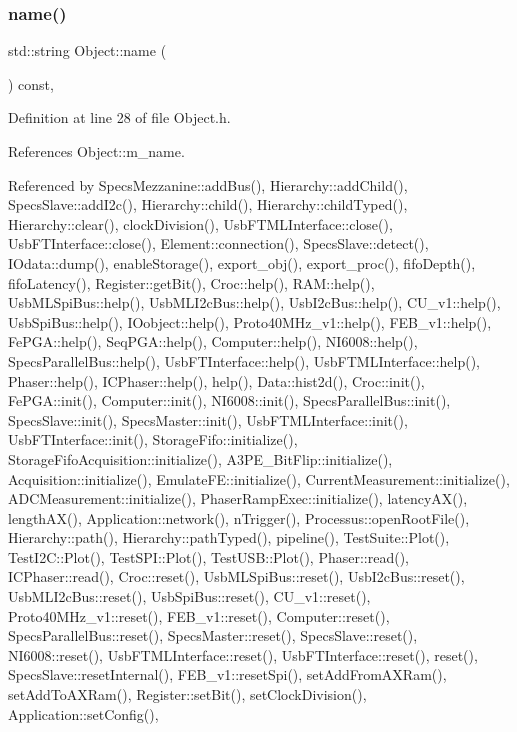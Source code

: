 \subsubsection{\texorpdfstring{name()}{name()}}
{\footnotesize\ttfamily std\+::string Object\+::name (\begin{DoxyParamCaption}{ }\end{DoxyParamCaption}) const\hspace{0.3cm}{\ttfamily [inline]}, {\ttfamily [inherited]}}



Definition at line 28 of file Object.\+h.



References Object\+::m\+\_\+name.



Referenced by Specs\+Mezzanine\+::add\+Bus(), Hierarchy\+::add\+Child(), Specs\+Slave\+::add\+I2c(), Hierarchy\+::child(), Hierarchy\+::child\+Typed(), Hierarchy\+::clear(), clock\+Division(), Usb\+F\+T\+M\+L\+Interface\+::close(), Usb\+F\+T\+Interface\+::close(), Element\+::connection(), Specs\+Slave\+::detect(), I\+Odata\+::dump(), enable\+Storage(), export\+\_\+obj(), export\+\_\+proc(), fifo\+Depth(), fifo\+Latency(), Register\+::get\+Bit(), Croc\+::help(), R\+A\+M\+::help(), Usb\+M\+L\+Spi\+Bus\+::help(), Usb\+M\+L\+I2c\+Bus\+::help(), Usb\+I2c\+Bus\+::help(), C\+U\+\_\+v1\+::help(), Usb\+Spi\+Bus\+::help(), I\+Oobject\+::help(), Proto40\+M\+Hz\+\_\+v1\+::help(), F\+E\+B\+\_\+v1\+::help(), Fe\+P\+G\+A\+::help(), Seq\+P\+G\+A\+::help(), Computer\+::help(), N\+I6008\+::help(), Specs\+Parallel\+Bus\+::help(), Usb\+F\+T\+Interface\+::help(), Usb\+F\+T\+M\+L\+Interface\+::help(), Phaser\+::help(), I\+C\+Phaser\+::help(), help(), Data\+::hist2d(), Croc\+::init(), Fe\+P\+G\+A\+::init(), Computer\+::init(), N\+I6008\+::init(), Specs\+Parallel\+Bus\+::init(), Specs\+Slave\+::init(), Specs\+Master\+::init(), Usb\+F\+T\+M\+L\+Interface\+::init(), Usb\+F\+T\+Interface\+::init(), Storage\+Fifo\+::initialize(), Storage\+Fifo\+Acquisition\+::initialize(), A3\+P\+E\+\_\+\+Bit\+Flip\+::initialize(), Acquisition\+::initialize(), Emulate\+F\+E\+::initialize(), Current\+Measurement\+::initialize(), A\+D\+C\+Measurement\+::initialize(), Phaser\+Ramp\+Exec\+::initialize(), latency\+A\+X(), length\+A\+X(), Application\+::network(), n\+Trigger(), Processus\+::open\+Root\+File(), Hierarchy\+::path(), Hierarchy\+::path\+Typed(), pipeline(), Test\+Suite\+::\+Plot(), Test\+I2\+C\+::\+Plot(), Test\+S\+P\+I\+::\+Plot(), Test\+U\+S\+B\+::\+Plot(), Phaser\+::read(), I\+C\+Phaser\+::read(), Croc\+::reset(), Usb\+M\+L\+Spi\+Bus\+::reset(), Usb\+I2c\+Bus\+::reset(), Usb\+M\+L\+I2c\+Bus\+::reset(), Usb\+Spi\+Bus\+::reset(), C\+U\+\_\+v1\+::reset(), Proto40\+M\+Hz\+\_\+v1\+::reset(), F\+E\+B\+\_\+v1\+::reset(), Computer\+::reset(), Specs\+Parallel\+Bus\+::reset(), Specs\+Master\+::reset(), Specs\+Slave\+::reset(), N\+I6008\+::reset(), Usb\+F\+T\+M\+L\+Interface\+::reset(), Usb\+F\+T\+Interface\+::reset(), reset(), Specs\+Slave\+::reset\+Internal(), F\+E\+B\+\_\+v1\+::reset\+Spi(), set\+Add\+From\+A\+X\+Ram(), set\+Add\+To\+A\+X\+Ram(), Register\+::set\+Bit(), set\+Clock\+Division(), Application\+::set\+Config(), 
